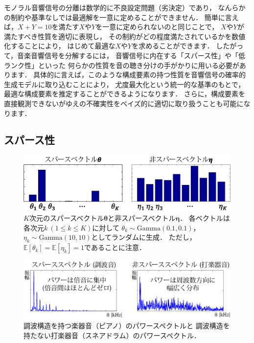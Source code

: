 モノラル音響信号の分離は数学的に不良設定問題（劣決定）であり，
なんらかの制約や基準なしでは最適解を一意に定めることができません．
簡単に言えば，$X+Y=10$を満たす$X$や$Y$を一意に定められないのと同じことで，
$X$や$Y$が満たすべき性質を適切に表現し，
その制約がどの程度満たされているかを数値化することにより，
はじめて最適な$X$や$Y$を求めることができます．
したがって，音楽音響信号を分解するには，
音響信号に内在する「スパース性」や「低ランク性」といった
何らかの性質を音の聴き分けの手がかりに用いる必要があります．
具体的に言えば，このような構成要素の持つ性質を音響信号の確率的生成モデルに取り込むことにより，
尤度最大化という統一的な基準のもとで，最適な構成要素を推定することができるようになります．
さらに，構成要素を直接観測できないがゆえの不確実性をベイズ的に適切に取り扱うことも可能になります．

\subsection{スパース性}

\begin{figure}[t]
\centering
\includegraphics[width=.93\linewidth]{sections/music/sparse}
\caption{$K$次元のスパースベクトル$\bm\theta$と非スパースベクトル$\bm\eta$．
各ベクトルは各次元$k \ (1 \le k \le K)$に対して
$\theta_k \sim \mbox{Gamma}(0.1, 0.1)$，$\eta_k \sim \mbox{Gamma}(10, 10)$としてランダムに生成．
ただし，$\mathbb{E}[\theta_k] = \mathbb{E}[\eta_k] = 1$であることに注意．}
\label{fig:sparse}
\end{figure}

\begin{figure}[t]
\centering
\includegraphics[width=.99\linewidth]{sections/music/sparse_spec}
\caption{調波構造を持つ楽器音（ピアノ）のパワースペクトルと
調波構造を持たない打楽器音（スネアドラム）のパワースペクトル．}
\label{fig:sparse_spec}
\end{figure}

